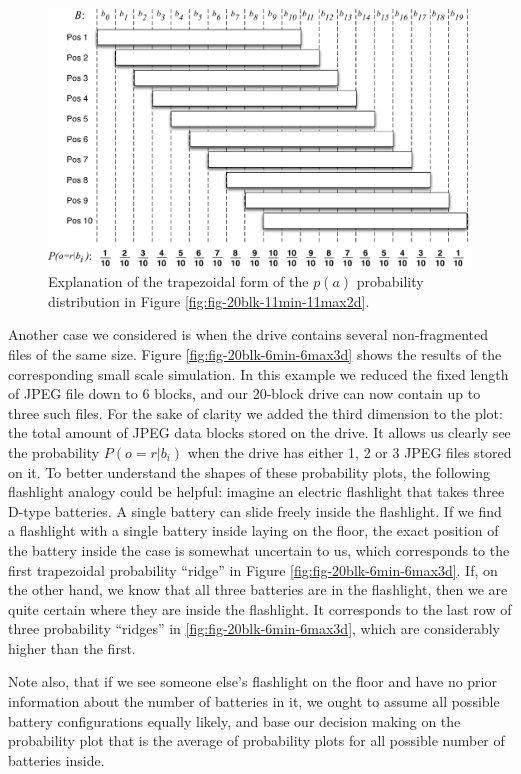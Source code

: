 \documentclass[final,5p,times,twocolumn,authoryear]{elsarticle}
\begin{document}
\begin{figure}
  \centerline{\includegraphics[width=\textwidth]{pa_explain.pdf}}
  \caption{Explanation of the trapezoidal form of the $p(a)$ probability distribution in Figure \ref{fig:fig-20blk-11min-11max2d}.}
  \label{fig:pa_explan}
\end{figure}

Another case we considered is when the drive contains several non-fragmented files of the same size. Figure \ref{fig:fig-20blk-6min-6max3d} shows the results of the corresponding small scale simulation. In this example we reduced the fixed length of JPEG file down to 6 blocks, and our 20-block drive can now contain up to three such files. For the sake of clarity we added the third dimension to the plot: the total amount of JPEG data blocks stored on the drive. It allows us clearly see the probability $P(o=r|b_i)$ when the drive has either 1, 2 or 3 JPEG files stored on it. To better understand the shapes of these probability plots, the following flashlight analogy could be helpful: imagine an electric flashlight that takes three D-type batteries. A single battery can slide freely inside the flashlight. If we find a flashlight with a single battery inside laying on the floor, the exact position of the battery inside the case is somewhat uncertain to us, which corresponds to the first trapezoidal probability ``ridge'' in Figure \ref{fig:fig-20blk-6min-6max3d}. If, on the other hand, we know that all three batteries are in the flashlight, then we are quite certain where they are inside the flashlight. It corresponds to the last row of three probability ``ridges'' in \ref{fig:fig-20blk-6min-6max3d}, which are considerably higher than the first.

Note also, that if we see someone else's flashlight on the floor and have no prior information about the number of batteries in it, we ought to assume all possible battery configurations equally likely, and base our decision making on the probability plot that is the average of probability plots for all possible number of batteries inside.
\end{document}
